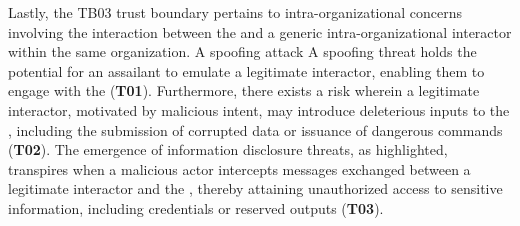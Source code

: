 \begin{newj}
Lastly, the TB03 trust boundary pertains to intra-organizational concerns involving the interaction between the  and a generic intra-organizational interactor within the same organization. A spoofing attack  A spoofing threat holds the potential for an assailant to emulate a legitimate interactor, enabling them to engage with the  (\textbf{T01}).%
Furthermore, there exists a risk wherein a legitimate interactor, motivated by malicious intent, may introduce deleterious inputs to the , including the submission of corrupted data or issuance of dangerous commands (\textbf{T02}). The emergence of information disclosure threats, as highlighted, transpires when a malicious actor intercepts messages exchanged between a legitimate interactor and the , thereby attaining unauthorized access to sensitive information, including credentials or reserved outputs (\textbf{T03}).
\end{newj}



